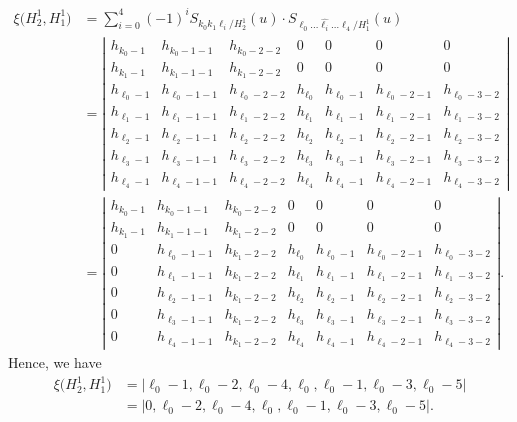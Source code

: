 \documentclass[pdftex]{sigma}
\numberwithin{equation}{section}
\begin{document}
\begin{align*}
\xi\bigl(H^{1}_{2},H^{1}_{1}\bigr)&=\sum_{i= 0}^{4}{(-1)}^{i}S_{k_0 k_1 \ell_i/H^{1}_{2}}(u)\cdot S_{\ell_0 \dots \widehat{\ell_i} \dots \ell_{4}/H^{1}_{1}}(u)\nonumber\\
&=\left|\begin{array}{ccc|cccc}
h_{k_0-1} & h_{k_0-1-1} &h_{k_0-2-2} & 0 & 0 & 0 &0\\
h_{k_1-1} & h_{k_1-1-1} &h_{k_1-2-2} & 0 & 0 & 0 &0\\
h_{\ell_0-1} & h_{\ell_0-1-1} &h_{\ell_0-2-2} & h_{\ell_{0}} &h_{\ell_{0}-1} & h_{\ell_{0}-2-1} & h_{\ell_{0}-3-2} \\\hline
h_{\ell_1-1} & h_{\ell_1-1-1} &h_{\ell_1-2-2} & h_{\ell_{1}} &h_{\ell_{1}-1}& h_{\ell_{1}-2-1} & h_{\ell_{1}-3-2}\\
h_{\ell_2-1} & h_{\ell_2-1-1} &h_{\ell_2-2-2} & h_{\ell_{2}} &h_{\ell_{2}-1}& h_{\ell_{2}-2-1} & h_{\ell_{2}-3-2}\\
h_{\ell_3-1} & h_{\ell_3-1-1} &h_{\ell_3-2-2} & h_{\ell_{3}} &h_{\ell_{3}-1}& h_{\ell_{3}-2-1} & h_{\ell_{3}-3-2}\\
h_{\ell_4-1} & h_{\ell_4-1-1} &h_{\ell_4-2-2} & h_{\ell_{4}} &h_{\ell_{4}-1}& h_{\ell_{4}-2-1} & h_{\ell_{4}-3-2}
\end{array}\right|\nonumber\\
&=\left|\begin{array}{ccc|cccc}
h_{k_0-1} & h_{k_0-1-1} &h_{k_0-2-2} & 0 & 0 & 0 &0\\
h_{k_1-1} & h_{k_1-1-1} &h_{k_1-2-2} & 0 & 0 & 0 &0\\
0 & h_{\ell_0-1-1} & h_{k_1-2-2} & h_{\ell_{0}} &h_{\ell_{0}-1} & h_{\ell_{0}-2-1} & h_{\ell_{0}-3-2} \\\hline
0 & h_{\ell_1-1-1} & h_{k_1-2-2} & h_{\ell_{1}} &h_{\ell_{1}-1}& h_{\ell_{1}-2-1} & h_{\ell_{1}-3-2}\\
0 & h_{\ell_2-1-1} & h_{k_1-2-2} & h_{\ell_{2}} &h_{\ell_{2}-1}& h_{\ell_{2}-2-1} & h_{\ell_{2}-3-2}\\
0 & h_{\ell_3-1-1} & h_{k_1-2-2} & h_{\ell_{3}} &h_{\ell_{3}-1}& h_{\ell_{3}-2-1} & h_{\ell_{3}-3-2}\\
0 & h_{\ell_4-1-1} & h_{k_1-2-2} & h_{\ell_{4}} &h_{\ell_{4}-1}& h_{\ell_{4}-2-1} & h_{\ell_{4}-3-2}
\end{array}\right|.\nonumber
\end{align*}
Hence, we have
\begin{align*}
\xi\bigl(H^{1}_{2},H^{1}_{1}\bigr)&=|\ell_{0}-1,\ell_{0}-2,\ell_{0}-4,\ell_{0},\ell_{0}-1,\ell_{0}-3,\ell_{0}-5|\\
&=|0,{\ell_{0}-2},{\ell_0-4},\ell_{0},{\ell_{0}-1},\ell_{0}-3,\ell_{0}-5|.
\end{align*}
\end{document}

